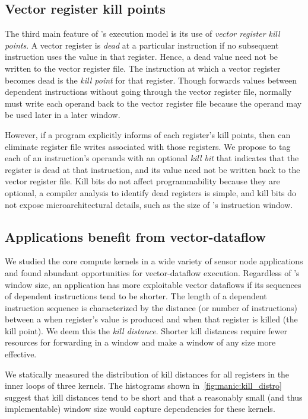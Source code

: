 \subsection{Vector register kill points}

The third main feature of \manic's execution model is its use of {\em vector
register kill points}.  A vector register is {\em dead} at a particular
instruction if no subsequent instruction uses the value in that register.
Hence, a dead value need not be written to the vector register file.
%
The instruction at which a vector register becomes dead is the {\em kill point}
for that register.
%
Though \manic forwards values between dependent instructions without
going through the vector register file,
\manic normally must write each operand back
to the vector register file because the operand may be
used later in a later window.

However, if a program explicitly informs \manic of each register's kill
points, then \manic can eliminate register file writes associated with those
registers. We propose to tag each of an instruction's operands  with an
optional {\em kill bit} that indicates that the register
is dead at that instruction, and its value need not be written back to the
vector register file.  Kill bits do
not affect programmability because they are optional, a compiler analysis to
identify dead registers is simple, and kill bits do not expose 
microarchitectural details, such as the size of \manic's instruction
window. 
%

\subsection{Applications benefit from vector-dataflow}
We studied the core compute kernels in a wide variety of sensor
node applications and found abundant opportunities for vector-dataflow execution.
%
Regardless of \manic's window size, an application has more exploitable vector
dataflows if its sequences of dependent instructions tend to be shorter.
%
The length of a dependent instruction sequence is characterized by the distance (or number of instructions) between a when register's value is produced and when that register is killed (the kill point).
%
We deem this the \emph{kill distance}.
%
Shorter kill distances require fewer
resources for forwarding in a window and make a window of any size more effective.
%

\figMANICKillDistro

We statically measured the distribution of kill distances for all registers in the
inner loops of three kernels. 
% 
The histograms shown in~\autoref{fig:manic:kill_distro} suggest that kill distances tend to be short and that a reasonably small (and thus implementable) window size would capture dependencies for these kernels.

